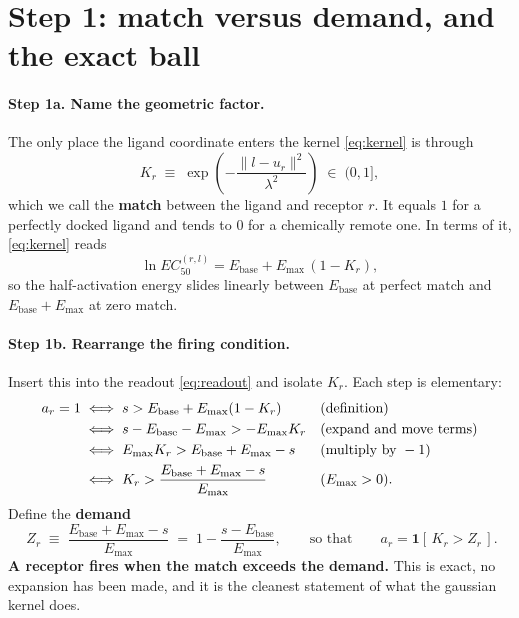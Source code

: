 \documentclass[11pt,a4paper]{article}
\newcommand{\Ebase}{E_{\mathrm{base}}}
\newcommand{\Emax}{E_{\mathrm{max}}}
\begin{document}
\section{Step 1: match versus demand, and the exact ball}
\label{sec:step1}

\paragraph{Step 1a. Name the geometric factor.} The only place the ligand coordinate
enters the kernel \eqref{eq:kernel} is through
\begin{equation}
  K_r \;\equiv\; \exp\!\left(-\frac{\|l-u_r\|^2}{\lambda^2}\right) \;\in\; (0,1],
\end{equation}
which we call the \textbf{match} between the ligand and receptor $r$. It equals $1$ for
a perfectly docked ligand and tends to $0$ for a chemically remote one. In terms of it,
\eqref{eq:kernel} reads
\begin{equation}
  \ln EC_{50}^{(r,l)} = \Ebase + \Emax\,(1 - K_r),
\end{equation}
so the half-activation energy slides linearly between $\Ebase$ at perfect match and
$\Ebase + \Emax$ at zero match.

\paragraph{Step 1b. Rearrange the firing condition.} Insert this into the readout
\eqref{eq:readout} and isolate $K_r$. Each step is elementary:
\begin{align}
  a_r = 1
  &\iff s > \Ebase + \Emax(1-K_r)
   &&\text{(definition)} \notag\\
  &\iff s - \Ebase - \Emax > -\Emax K_r
   &&\text{(expand and move terms)} \notag\\
  &\iff \Emax K_r > \Ebase + \Emax - s
   &&\text{(multiply by }-1) \notag\\
  &\iff K_r > \frac{\Ebase + \Emax - s}{\Emax}
   &&(\Emax > 0).
\end{align}
Define the \textbf{demand}
\begin{equation}
  \boxed{\;Z_r \;\equiv\; \frac{\Ebase + \Emax - s}{\Emax}
         \;=\; 1 - \frac{s - \Ebase}{\Emax},
  \qquad\text{so that}\qquad
  a_r = \mathbf{1}\!\left[\,K_r > Z_r\,\right]. }
  \label{eq:demand}
\end{equation}
\textbf{A receptor fires when the match exceeds the demand.} This is exact, no expansion
has been made, and it is the cleanest statement of what the gaussian kernel does.
\end{document}
